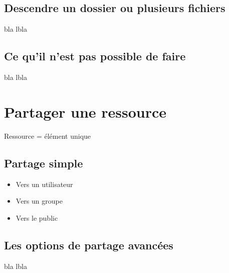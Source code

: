 \subsection*{Descendre un dossier ou plusieurs fichiers}

bla lbla

\subsection*{Ce qu'il n'est pas possible de faire}

bla lbla

\section*{Partager une ressource}

Ressource = élément unique

\subsection*{Partage simple}

\begin{itemize}
    \item Vers un utilisateur
    \item Vers un groupe
    \item Vers le public 
\end{itemize}

\subsection*{Les options de partage avancées}

bla lbla